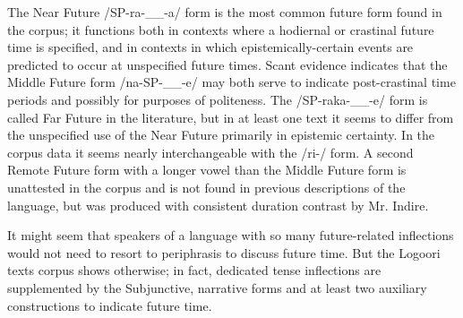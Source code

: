 \documentclass[output=paper]{langsci/langscibook}
\begin{document}
The Near Future /SP-ra-\_\_-a/ form is the most common future form found in the corpus; it functions both in contexts where a hodiernal or crastinal future time is specified, and in contexts in which epistemically-certain events are predicted to occur at unspecified future times. Scant evidence indicates that the Middle Future form /na-SP-\_\_-e/ may both serve to indicate post-crastinal time periods and possibly for purposes of politeness. The /SP-raka-\_\_-e/ form is called Far Future in the literature, but in at least one text it seems to differ from the unspecified use of the Near Future primarily in epistemic certainty. In the corpus data it seems nearly interchangeable with the /ri-/ form. A second Remote Future form with a longer vowel than the Middle Future form is unattested in the corpus and is not found in previous descriptions of the language, but was produced with consistent duration contrast by Mr. Indire. 

It might seem that speakers of a language with so many future-related inflections would not need to resort to periphrasis to discuss future time. But the Logoori texts corpus shows otherwise; in fact, dedicated tense inflections are supplemented by the Subjunctive, narrative forms and at least two auxiliary constructions to indicate future time.
\end{document}
